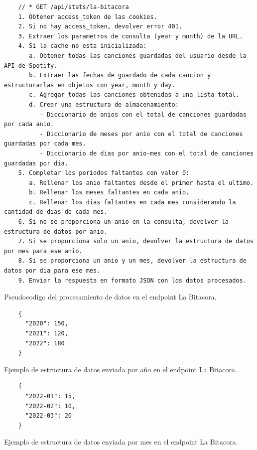 \begin{ifalgorithm}[H]
  \begin{lstlisting}
    // * GET /api/stats/la-bitacora
    1. Obtener access_token de las cookies.
    2. Si no hay access_token, devolver error 401.
    3. Extraer los parametros de consulta (year y month) de la URL.
    4. Si la cache no esta inicializada:
       a. Obtener todas las canciones guardadas del usuario desde la API de Spotify.
       b. Extraer las fechas de guardado de cada cancion y estructurarlas en objetos con year, month y day.
       c. Agregar todas las canciones obtenidas a una lista total.
       d. Crear una estructura de almacenamiento:
          - Diccionario de anios con el total de canciones guardadas por cada anio.
          - Diccionario de meses por anio con el total de canciones guardadas por cada mes.
          - Diccionario de dias por anio-mes con el total de canciones guardadas por dia.
    5. Completar los periodos faltantes con valor 0:
       a. Rellenar los anio faltantes desde el primer hasta el ultimo.
       b. Rellenar los meses faltantes en cada anio.
       c. Rellenar los dias faltantes en cada mes considerando la cantidad de dias de cada mes.
    6. Si no se proporciona un anio en la consulta, devolver la estructura de datos por anio.
    7. Si se proporciona solo un anio, devolver la estructura de datos por mes para ese anio.
    8. Si se proporciona un anio y un mes, devolver la estructura de datos por dia para ese mes.
    9. Enviar la respuesta en formato JSON con los datos procesados.
    \end{lstlisting}
  \caption{Pseudocodigo del procesamiento de datos en el endpoint La Bitacora.}
  \label{alg:la_bitacora}
\end{ifalgorithm}

\begin{ifalgorithm}[H]
  \begin{lstlisting}
    {
      "2020": 150,
      "2021": 120,
      "2022": 180
    }
    \end{lstlisting}
  \caption{Ejemplo de estructura de datos enviada por año en el endpoint La Bitacora.}
  \label{alg:la_bitacora_response_year}
\end{ifalgorithm}

\begin{ifalgorithm}[H]
  \begin{lstlisting}
    {
      "2022-01": 15,
      "2022-02": 10,
      "2022-03": 20
    }
    \end{lstlisting}
  \caption{Ejemplo de estructura de datos enviada por mes en el endpoint La Bitacora.}
  \label{alg:la_bitacora_response_month}
\end{ifalgorithm}

